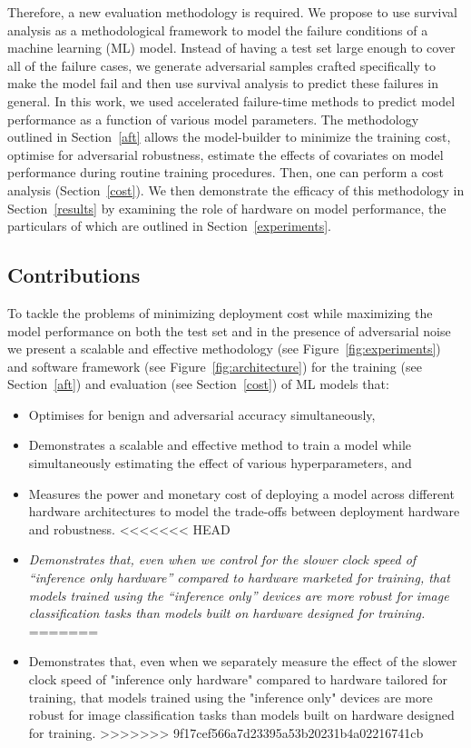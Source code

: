 \documentclass[sn-mathphys-num]{sn-jnl}%
\newcommand{\cm}[1]{\textit{{\color{blue}#1}}}
\begin{document}
Therefore, a new evaluation methodology is required.
We propose to use survival analysis as a methodological framework to model the failure conditions of a machine learning (ML) model. Instead of having a test set large enough to cover all of the failure cases, we generate adversarial samples crafted specifically to make the model fail and then use survival analysis to predict these failures in general.
In this work, we used accelerated failure-time methods to predict model performance as a function of various model parameters. The methodology outlined in Section~\ref{aft} allows the model-builder to minimize the training cost, optimise for adversarial robustness, estimate the effects of covariates on model performance during routine training procedures. Then, one can perform a cost analysis (Section~\ref{cost}). We then demonstrate the efficacy of this methodology in Section~\ref{results} by examining the role of hardware on model performance, the particulars of which are outlined in Section~\ref{experiments}.


\subsection{Contributions}
To tackle the problems of minimizing deployment cost while maximizing the model performance on both the test set and in the presence of adversarial noise we present a scalable and effective methodology (see  Figure~\ref{fig:experiments}) and software framework (see Figure~\ref{fig:architecture}) for the training (see Section~\ref{aft}) and evaluation (see Section~\ref{cost}) of ML models that:
\begin{itemize}
    \item Optimises for benign and adversarial accuracy simultaneously,
    \item Demonstrates a scalable and effective method to train a model while simultaneously estimating the effect of various hyperparameters, and
    \item Measures the power and monetary cost of deploying a model across different hardware architectures to model the trade-offs between deployment hardware and robustness.
<<<<<<< HEAD
    \item \cm{Demonstrates that, even when we control for the slower clock speed of ``inference only hardware'' compared to hardware marketed for training, that models trained using the ``inference only'' devices are more robust for image classification tasks than models built on hardware designed for training.}
=======
    \item Demonstrates that, even when we separately measure the effect of the slower clock speed of "inference only hardware" compared to hardware tailored for training, that models trained using the "inference only" devices are more robust for image classification tasks than models built on hardware designed for training.
>>>>>>> 9f17cef566a7d23395a53b20231b4a02216741cb
\end{itemize}
\end{document}
